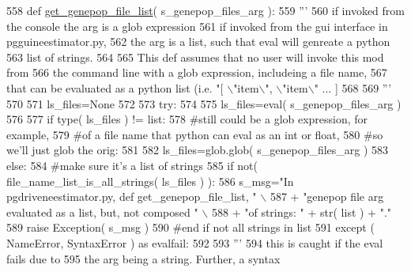 \begin{DoxyCode}
558 \textcolor{keyword}{def }\hyperlink{namespacenegui_1_1pgdriveneestimator_a15b09d2967ec4812353b0e146f074799}{get\_genepop\_file\_list}( s\_genepop\_files\_arg ):
559     \textcolor{stringliteral}{'''}
560 \textcolor{stringliteral}{    if invoked from the console the arg is a glob expression}
561 \textcolor{stringliteral}{    if invoked from the gui interface in pgguineestimator.py,}
562 \textcolor{stringliteral}{    the arg is a list, such that eval will genreate a python}
563 \textcolor{stringliteral}{    list of strings.}
564 \textcolor{stringliteral}{}
565 \textcolor{stringliteral}{    This def assumes that no user will invoke this mod from }
566 \textcolor{stringliteral}{    the command line with a glob expression, includeing a file name,}
567 \textcolor{stringliteral}{    that can be evaluated as a python list (i.e. "[ \(\backslash\)"item\(\backslash\)", \(\backslash\)"item\(\backslash\)" ... ]}
568 \textcolor{stringliteral}{    }
569 \textcolor{stringliteral}{    '''}
570 
571     ls\_files=\textcolor{keywordtype}{None}
572 
573     \textcolor{keywordflow}{try}:
574 
575         ls\_files=eval( s\_genepop\_files\_arg )
576 
577         \textcolor{keywordflow}{if} type( ls\_files ) != list:
578             \textcolor{comment}{#still could be a glob expression, for example,}
579             \textcolor{comment}{#of a file name that python can eval as an int or float,}
580             \textcolor{comment}{#so we'll just glob the orig:}
581 
582             ls\_files=glob.glob( s\_genepop\_files\_arg )
583         \textcolor{keywordflow}{else}:
584             \textcolor{comment}{#make sure it's a list of strings}
585             \textcolor{keywordflow}{if} not( file\_name\_list\_is\_all\_strings( ls\_files ) ):
586                 s\_msg=\textcolor{stringliteral}{"In pgdriveneestimator.py, def get\_genepop\_file\_list, "} \(\backslash\)
587                         + \textcolor{stringliteral}{"genepop file arg evaluated as a list, but, not composed "} \(\backslash\)
588                         + \textcolor{stringliteral}{"of strings: "} + str( list ) + \textcolor{stringliteral}{"."}
589                 \textcolor{keywordflow}{raise} Exception( s\_msg )
590             \textcolor{comment}{#end if not all strings in list}
591     \textcolor{keywordflow}{except} ( NameError, SyntaxError ) \textcolor{keyword}{as} evalfail:
592 
593         \textcolor{stringliteral}{'''}
594 \textcolor{stringliteral}{        this is caught if the eval fails due to }
595 \textcolor{stringliteral}{        the arg being a string.  Further, a syntax}

\end{DoxyCode}
